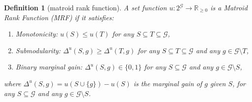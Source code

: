 \documentclass[]{article}
\newtheorem{definition}{Definition}
\newcommand{\items}{\mathcal{G}}
\begin{document}
\begin{definition}[matroid rank function] \label{def: mrf}
    A set function $u: 2^\items \rightarrow \mathbb{R}_{\geq 0}$ is a \emph{Matroid Rank Function} (MRF) if it satisfies:
    \begin{enumerate}
        \item Monotonicity: $u(S) \leq u(T)$  for any $S \subseteq T \subseteq \items$, 
        \item Submodularity: $\Delta^u(S, g) \geq \Delta^u(T, g)$ for any $S  \subseteq T \subseteq \items$ and any $g \in \items \setminus T$, 
        \item Binary marginal gain: $\Delta^u(S, g)  \in \{0, 1\}$ for any $S \subseteq \items$ and any $g \in \items \setminus S$,
    \end{enumerate}
    where $\Delta^u(S, g) = u(S \cup \{g\}) - u(S)$ is the marginal gain of $g$ given $S$, for any $S \subseteq \items$ and any $g \in \items \setminus S$.
\end{definition}
\end{document}

